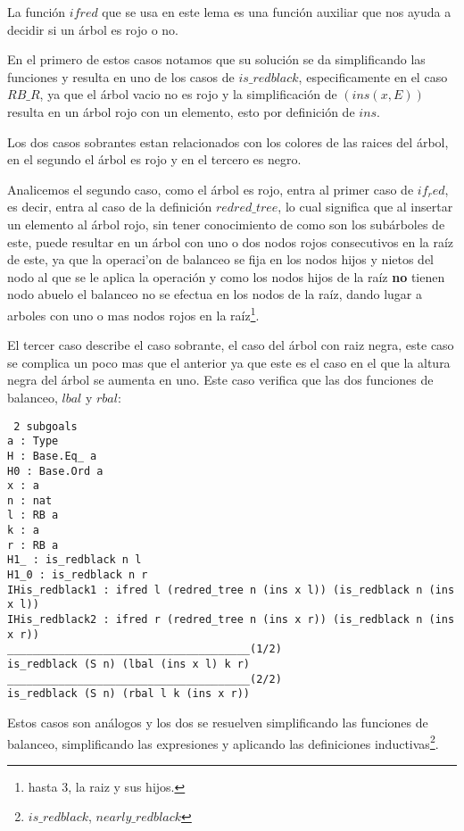 \documentclass[letterpaper,12pt,oneside]{book}
\theoremstyle{plain}
\theoremstyle{definition}
\theoremstyle{remark}
\begin{document}
 La funci\'on $ifred$ que se usa en este lema es una funci\'on auxiliar que nos ayuda a decidir si un \'arbol es 
 rojo o no. 

 En el primero de estos casos notamos que su soluci\'on se da simplificando las funciones y resulta en uno de los
 casos de $is\_redblack$, especificamente en el caso $RB\_R$, ya que el \'arbol vacio no es rojo y la 
 simplificaci\'on de $(ins(x,E))$ resulta en un \'arbol rojo con un elemento, esto por definici\'on de $ins$.

 Los dos casos sobrantes estan relacionados con los colores de las raices del \'arbol, en el segundo el \'arbol 
 es rojo y en el tercero es negro. 
 
 Analicemos el segundo caso, como el \'arbol es rojo, entra al primer caso de $if_red$, es decir, entra al caso 
 de la definici\'on $redred\_tree$, lo cual significa que al insertar un elemento al \'arbol rojo, sin tener 
 conocimiento de como son los subárboles de este, puede resultar en un \'arbol con uno o dos nodos rojos 
 consecutivos en la ra\'iz de este, ya que la operaci'on de balanceo se fija en los nodos hijos y nietos del nodo
 al que se le aplica la operaci\'on y como los nodos hijos de la raíz \textbf{no} tienen nodo abuelo el balanceo 
 no se efectua en los nodos de la raíz, dando lugar a arboles con uno o mas nodos rojos en la raíz\footnote{hasta
 3, la raiz y sus hijos.}.
 
 El tercer caso describe el caso sobrante, el caso del \'arbol con raiz negra, este caso se complica un poco mas 
 que el anterior ya que este es el caso en el que la altura negra del \'arbol se aumenta en uno. Este caso 
 verifica que las dos funciones de balanceo, $lbal$ y $rbal$:
 
 \begin{verbatim}
 2 subgoals
a : Type
H : Base.Eq_ a
H0 : Base.Ord a
x : a
n : nat
l : RB a
k : a
r : RB a
H1_ : is_redblack n l
H1_0 : is_redblack n r
IHis_redblack1 : ifred l (redred_tree n (ins x l)) (is_redblack n (ins x l))
IHis_redblack2 : ifred r (redred_tree n (ins x r)) (is_redblack n (ins x r))
______________________________________(1/2)
is_redblack (S n) (lbal (ins x l) k r)
______________________________________(2/2)
is_redblack (S n) (rbal l k (ins x r))
\end{verbatim}

Estos casos son análogos y los dos se resuelven simplificando las funciones de balanceo, simplificando las expresiones 
y aplicando las definiciones inductivas\footnote{$is\_redblack$, $nearly\_redblack$}.
\end{document}

